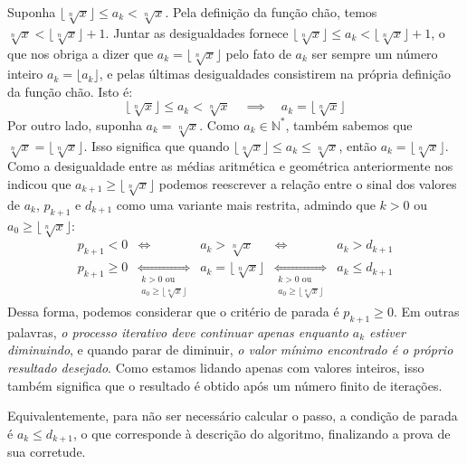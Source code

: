 Suponha $\lfloor \sqrt[n]{x} \rfloor \le a_k < \sqrt[n]{x}$.
Pela definição da função chão, temos
$\sqrt[n]{x} < \lfloor\sqrt[n]{x}\rfloor + 1$.
Juntar as desigualdades fornece
$\lfloor\sqrt[n]{x}\rfloor \le a_k < \lfloor\sqrt[n]{x}\rfloor + 1$,
o que nos obriga a dizer que $a_k = \lfloor\sqrt[n]{x}\rfloor$
pelo fato de $a_k$ ser sempre um número inteiro
$a_k = \lfloor a_k \rfloor$,
e pelas últimas desigualdades consistirem
na própria definição da função chão.
Isto é:
\[
  \lfloor \sqrt[n]{x} \rfloor \le a_k < \sqrt[n]{x}
  \quad\implies\quad
  a_k = \lfloor \sqrt[n]{x} \rfloor
\]
Por outro lado, suponha $a_k = \sqrt[n]{x}$.
Como $a_k \in \mathds{N}^*$,
também sabemos que $\sqrt[n]{x} = \lfloor \sqrt[n]{x} \rfloor$.
Isso significa que
quando $\lfloor \sqrt[n]{x} \rfloor \le a_k \le \sqrt[n]{x}$,
então $a_k = \lfloor \sqrt[n]{x} \rfloor$.
Como a desigualdade entre as médias aritmética e geométrica
anteriormente nos indicou que
$a_{k+1} \ge \lfloor \sqrt[n]{x} \rfloor$
podemos reescrever
a relação entre o sinal dos valores de $a_k$, $p_{k+1}$ e $d_{k+1}$
como uma variante mais restrita,
admindo que $k > 0$ ou $a_0 \ge \lfloor \sqrt[n]{x} \rfloor$:
\[
  \begin{array}{lcccr}
      p_{k+1} < 0
    &\iff&
      a_k > \sqrt[n]{x}
    &\iff&
      a_k > d_{k+1}
    \\
      p_{k+1} \ge 0
    &\underset{\substack{k > 0 \text{ ou} \\[.2em]
                         a_0 \ge \lfloor \sqrt[n]{x} \rfloor}}{\iff}&
      a_k = \lfloor \sqrt[n]{x} \rfloor
    &\underset{\substack{k > 0 \text{ ou} \\[.2em]
                         a_0 \ge \lfloor \sqrt[n]{x} \rfloor}}{\iff}&
      a_k \le d_{k+1}
  \end{array}
\]
Dessa forma,
podemos considerar que o critério de parada é $p_{k+1} \ge 0$.
Em outras palavras,
\emph{o processo iterativo deve continuar
      apenas enquanto $a_k$ estiver diminuindo},
e quando parar de diminuir,
\emph{o valor mínimo encontrado é o próprio resultado desejado}.
Como estamos lidando apenas com valores inteiros,
isso também significa que o resultado é obtido
após um número finito de iterações.

Equivalentemente, para não ser necessário calcular o passo,
a condição de parada é $a_k \le d_{k+1}$,
o que corresponde à descrição do algoritmo,
finalizando a prova de sua corretude.
